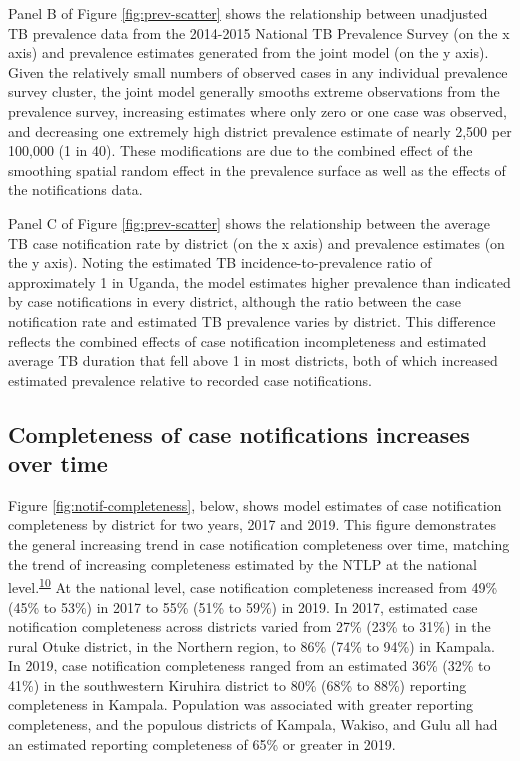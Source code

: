 \documentclass[
]{article}
\begin{document}
Panel B of Figure \ref{fig:prev-scatter} shows the relationship between unadjusted TB prevalence data from the 2014-2015 National TB Prevalence Survey (on the x axis) and prevalence estimates generated from the joint model (on the y axis). Given the relatively small numbers of observed cases in any individual prevalence survey cluster, the joint model generally smooths extreme observations from the prevalence survey, increasing estimates where only zero or one case was observed, and decreasing one extremely high district prevalence estimate of nearly 2,500 per 100,000 (1 in 40). These modifications are due to the combined effect of the smoothing spatial random effect in the prevalence surface as well as the effects of the notifications data.

Panel C of Figure \ref{fig:prev-scatter} shows the relationship between the average TB case notification rate by district (on the x axis) and prevalence estimates (on the y axis). Noting the estimated TB incidence-to-prevalence ratio of approximately 1 in Uganda, the model estimates higher prevalence than indicated by case notifications in every district, although the ratio between the case notification rate and estimated TB prevalence varies by district. This difference reflects the combined effects of case notification incompleteness and estimated average TB duration that fell above 1 in most districts, both of which increased estimated prevalence relative to recorded case notifications.

\hypertarget{completeness-of-case-notifications-increases-over-time}{%
\subsection{Completeness of case notifications increases over time}\label{completeness-of-case-notifications-increases-over-time}}

Figure \ref{fig:notif-completeness}, below, shows model estimates of case notification completeness by district for two years, 2017 and 2019. This figure demonstrates the general increasing trend in case notification completeness over time, matching the trend of increasing completeness estimated by the NTLP at the national level.\textsuperscript{\protect\hyperlink{ref-UgandaNationalTuberculosisandLeprosyProgramme2020}{10}} At the national level, case notification completeness increased from 49\% (45\% to 53\%) in 2017 to 55\% (51\% to 59\%) in 2019. In 2017, estimated case notification completeness across districts varied from 27\% (23\% to 31\%) in the rural Otuke district, in the Northern region, to 86\% (74\% to 94\%) in Kampala. In 2019, case notification completeness ranged from an estimated 36\% (32\% to 41\%) in the southwestern Kiruhira district to 80\% (68\% to 88\%) reporting completeness in Kampala. Population was associated with greater reporting completeness, and the populous districts of Kampala, Wakiso, and Gulu all had an estimated reporting completeness of 65\% or greater in 2019.
\end{document}
